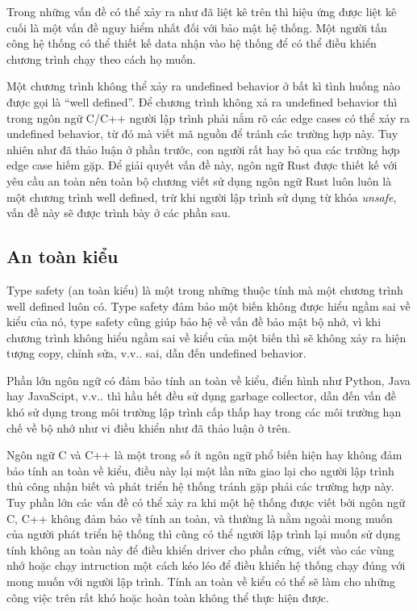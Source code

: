 Trong những vấn đề có thể xảy ra như đã liệt kê trên thì hiệu ứng được liệt kê cuối là một vấn đề nguy hiểm nhất đối với bảo mật hệ thống.
Một người tấn công hệ thống có thể thiết kế data nhận vào hệ thống để có thể điều khiển chương trình chạy theo cách họ muốn.

Một chương trình không thể xảy ra undefined behavior ở bất kì tình huống nào được gọi là ``well defined''.
Để chương trình không xả ra undefined behavior thì trong ngôn ngữ C/C++ người lập trình phải nắm rõ các edge cases có thể xảy ra undefined behavior, từ đó mà viết mã nguồn để tránh các trường hợp này.
Tuy nhiên như đã thảo luận ở phần trước, con người rất hay bỏ qua các trường hợp edge case hiếm gặp.
Để giải quyết vấn đề này, ngôn ngữ Rust được thiết kế với yêu cầu an toàn nên toàn bộ chương viết sử dụng ngôn ngữ Rust luôn luôn là một chương trình well defined, trừ khi người lập trình sử dụng từ khóa \emph{unsafe}, vấn đề này sẽ được trình bày ở các phần sau.

%

\subsection{An toàn kiểu}
Type safety (an toàn kiểu) là một trong những thuộc tính mà một chương trình well defined luôn có. Type safety đảm bảo một biến không được hiểu ngầm sai về kiểu của nó, type safety cũng giúp bảo hệ về vấn đề bảo mật bộ nhớ, vì khi chương trình không hiểu ngầm sai về kiểu của một biến thì sẽ không xảy ra hiện tượng copy, chỉnh sửa, v.v.. sai, dẫn đến undefined behavior.

Phần lớn ngôn ngữ có đảm bảo tính an toàn về kiểu, điển hình như Python, Java hay JavaScipt, v.v.. thì hầu hết đều sử dụng garbage collector, dẫn đến vấn đề khó sử dụng trong môi trường lập trình cấp thấp hay trong các môi trường hạn chế về bộ nhớ như vi điều khiển như đã thảo luận ở trên.

Ngôn ngữ C và C++ là một trong số ít ngôn ngữ phổ biến hiện hay không đảm bảo tính an toàn về kiểu, điều này lại một lần nữa giao lại cho người lập trình thủ công nhận biết và phát triển hệ thống tránh gặp phải các trường hợp này.
Tuy phần lớn các vấn đề có thể xảy ra khi một hệ thống được viết bởi ngôn ngữ C, C++ không đảm bảo về tính an toàn, và thường là nằm ngoài mong muốn của người phát triển hệ thống thì cũng có thể người lập trình lại muốn sử dụng tính không an toàn này để điều khiển driver cho phần cứng, viết vào các vùng nhớ hoặc chạy intruction một cách kéo léo để điều khiển hệ thống chạy đúng với mong muốn với người lập trình.
Tính an toàn về kiểu có thể sẽ làm cho những công việc trên rất khó hoặc hoàn toàn không thể thực hiện được.

